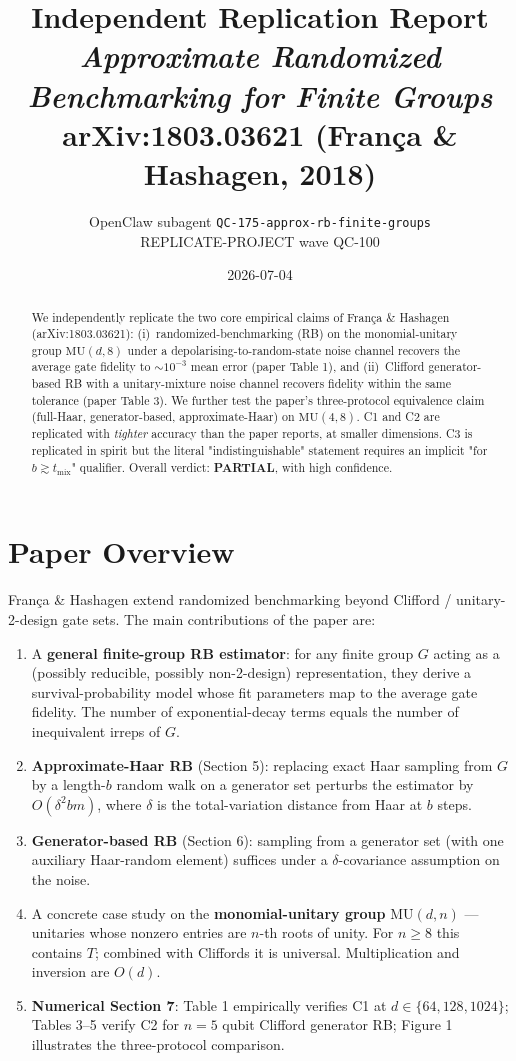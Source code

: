 \documentclass[11pt]{article}
\title{Independent Replication Report\\[4pt]
\large \textit{Approximate Randomized Benchmarking for Finite Groups}\\
\normalsize arXiv:1803.03621 (Fran\c{c}a \& Hashagen, 2018)}
\author{OpenClaw subagent \texttt{QC-175-approx-rb-finite-groups} \\
        REPLICATE-PROJECT wave QC-100}
\date{2026-07-04}
\begin{document}
\maketitle

\begin{abstract}
We independently replicate the two core empirical claims of Fran\c{c}a \& Hashagen (arXiv:1803.03621): (i)~randomized-benchmarking (RB) on the monomial-unitary group $\mathrm{MU}(d,8)$ under a depolarising-to-random-state noise channel recovers the average gate fidelity to $\sim\!10^{-3}$ mean error (paper Table 1), and (ii)~Clifford generator-based RB with a unitary-mixture noise channel recovers fidelity within the same tolerance (paper Table 3). We further test the paper's three-protocol equivalence claim (full-Haar, generator-based, approximate-Haar) on $\mathrm{MU}(4,8)$. C1 and C2 are replicated with \emph{tighter} accuracy than the paper reports, at smaller dimensions. C3 is replicated in spirit but the literal "indistinguishable" statement requires an implicit "for $b \gtrsim t_{\text{mix}}$" qualifier. Overall verdict: \textbf{PARTIAL}, with high confidence.
\end{abstract}

\section{Paper Overview}
Fran\c{c}a \& Hashagen extend randomized benchmarking beyond Clifford / unitary-2-design gate sets. The main contributions of the paper are:
\begin{enumerate}
    \item A \textbf{general finite-group RB estimator}: for any finite group $G$ acting as a (possibly reducible, possibly non-2-design) representation, they derive a survival-probability model whose fit parameters map to the average gate fidelity. The number of exponential-decay terms equals the number of inequivalent irreps of $G$.
    \item \textbf{Approximate-Haar RB} (Section 5): replacing exact Haar sampling from $G$ by a length-$b$ random walk on a generator set perturbs the estimator by $O(\delta^2 b m)$, where $\delta$ is the total-variation distance from Haar at $b$ steps.
    \item \textbf{Generator-based RB} (Section 6): sampling from a generator set (with one auxiliary Haar-random element) suffices under a $\delta$-covariance assumption on the noise.
    \item A concrete case study on the \textbf{monomial-unitary group} $\mathrm{MU}(d,n)$ --- unitaries whose nonzero entries are $n$-th roots of unity. For $n\ge 8$ this contains $T$; combined with Cliffords it is universal. Multiplication and inversion are $O(d)$.
    \item \textbf{Numerical Section 7}: Table 1 empirically verifies C1 at $d\in\{64,128,1024\}$; Tables 3--5 verify C2 for $n=5$ qubit Clifford generator RB; Figure 1 illustrates the three-protocol comparison.
\end{enumerate}
\end{document}
